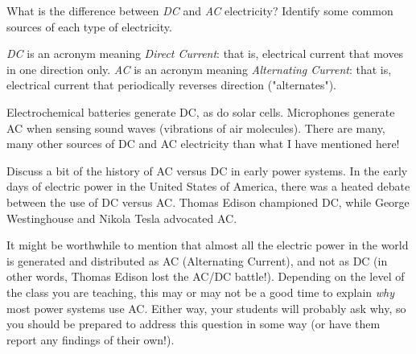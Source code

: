 

What is the difference between {\it DC} and {\it AC} electricity?  Identify some common sources of each type of electricity.







{\it DC} is an acronym meaning {\it Direct Current}: that is, electrical current that moves in one direction only.  {\it AC} is an acronym meaning {\it Alternating Current}: that is, electrical current that periodically reverses direction ("alternates").

Electrochemical batteries generate DC, as do solar cells.  Microphones generate AC when sensing sound waves (vibrations of air molecules).  There are many, many other sources of DC and AC electricity than what I have mentioned here!







Discuss a bit of the history of AC versus DC in early power systems.  In the early days of electric power in the United States of America, there was a heated debate between the use of DC versus AC.  Thomas Edison championed DC, while George Westinghouse and Nikola Tesla advocated AC.

It might be worthwhile to mention that almost all the electric power in the world is generated and distributed as AC (Alternating Current), and not as DC (in other words, Thomas Edison lost the AC/DC battle!).  Depending on the level of the class you are teaching, this may or may not be a good time to explain {\it why} most power systems use AC.  Either way, your students will probably ask why, so you should be prepared to address this question in some way (or have them report any findings of their own!).




